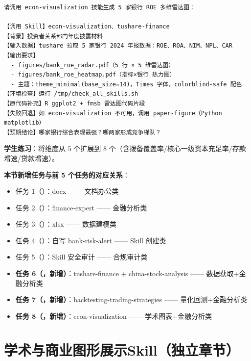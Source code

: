 \begin{lstlisting}
请调用 econ-visualization 技能生成 5 家银行 ROE 多维雷达图：

【调用 Skill】econ-visualization、tushare-finance
【背景】投资者关系部门年度披露材料
【输入数据】tushare 拉取 5 家银行 2024 年报数据：ROE、ROA、NIM、NPL、CAR
【输出要求】
  - figures/bank_roe_radar.pdf（5 行 × 5 维雷达图）
  - figures/bank_roe_heatmap.pdf（指标×银行 热力图）
  - 主题：theme_minimal(base_size=14)，Times 字体，colorblind-safe 配色
【环境检查】运行 /tmp/check_all_skills.sh
【原代码补充】R ggplot2 + fmsb 雷达图代码片段
【失败回退】如 econ-visualization 不可用，调用 paper-figure（Python matplotlib）
【预期结论】哪家银行综合表现最强？哪两家形成竞争梯队？
\end{lstlisting}

\textbf{学生练习}：将维度从 5 个扩展到 8 个（含拨备覆盖率/核心一级资本充足率/存款增速/贷款增速）。

\textbf{本节新增任务与前 5 个任务的对应关系}：
\begin{itemize}[leftmargin=1em]
  \item 任务 1（）：docx —— 文档办公类
  \item 任务 2（）：finance-expert —— 金融分析类
  \item 任务 3（）：xlsx —— 数据建模类
  \item 任务 4（）：自写 bank-risk-alert —— Skill 创建类
  \item 任务 5（）：Skill 安全审计 —— 合规审计类
  \item \textbf{任务 6（，新增）}：tushare-finance + china-stock-analysis —— 数据获取+金融分析类
  \item \textbf{任务 7（，新增）}：backtesting-trading-strategies —— 量化回测+金融分析类
  \item \textbf{任务 8（，新增）}：econ-visualization —— 学术图表+金融分析类
\end{itemize}

\section{学术与商业图形展示Skill（独立章节）}


